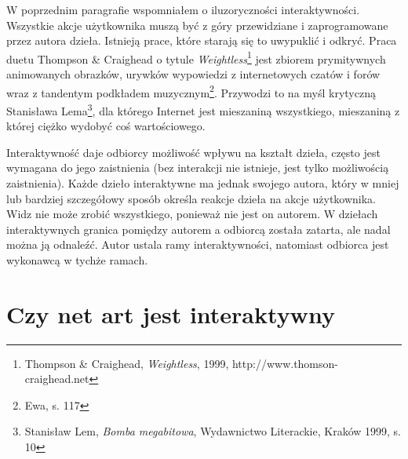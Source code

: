 \documentclass[a4paper,12pt,twoside]{article}
\begin{document}
W poprzednim paragrafie wspomniałem o iluzoryczności interaktywności.
Wszystkie akcje użytkownika muszą być z góry przewidziane
i zaprogramowane przez autora dzieła. Istnieją prace, które starają
się to uwypuklić  i odkryć. Praca duetu Thompson \& Craighead o tytule
\textit{Weightless}\footnote{Thompson \& Craighead, \textit{Weightless},
1999, http://www.thomson-craighead.net} jest zbiorem prymitywnych
animowanych obrazków, urywków wypowiedzi z internetowych czatów i forów
wraz z tandentym podkładem muzycznym\footnote{Ewa, s. 117}.
Przywodzi to na myśl krytyczną Stanisława
Lema\footnote{Stanisław Lem, \textit{Bomba megabitowa},
Wydawnictwo Literackie, Kraków 1999, s. 10}, dla którego Internet jest
mieszaniną wszystkiego, mieszaniną z której ciężko wydobyć coś wartościowego.

Interaktywność daje odbiorcy możliwość wpływu na kształt dzieła,
często jest wymagana do jego zaistnienia (bez interakcji nie istnieje,
jest tylko możliwością zaistnienia). Każde dzieło interaktywne ma jednak
swojego autora, który w mniej lub bardziej szczegółowy sposób określa
reakcje dzieła na akcje użytkownika. Widz nie może zrobić wszystkiego,
ponieważ nie jest on autorem. W dziełach interaktywnych granica pomiędzy
autorem a odbiorcą została zatarta, ale nadal można ją odnaleźć. Autor
ustala ramy interaktywności, natomiast odbiorca jest wykonawcą w tychże
ramach.



\section{Czy net art jest interaktywny}

\end{document}
